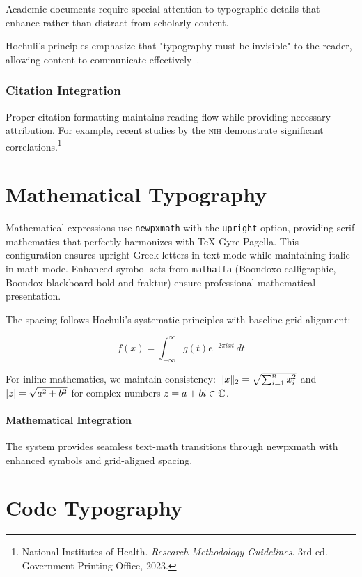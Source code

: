 \documentclass[11pt]{article}
\begin{document}
Academic documents require special attention to typographic details that enhance rather than distract from scholarly content.

Hochuli's principles emphasize that "typography must be invisible" to the reader, allowing content to communicate effectively~\parencite{hochuli1987detail}.

\subsubsection{Citation Integration}

Proper citation formatting maintains reading flow while providing necessary attribution. For example, recent studies by the \textsc{nih} demonstrate significant correlations.\footnote{National Institutes of Health. \textit{Research Methodology Guidelines}. 3rd ed. Government Printing Office, 2023.}

\section{Mathematical Typography}

Mathematical expressions use \texttt{newpxmath} with the \texttt{upright} option, providing serif mathematics that perfectly harmonizes with TeX Gyre Pagella. This configuration ensures upright Greek letters in text mode while maintaining italic in math mode. Enhanced symbol sets from \texttt{mathalfa} (Boondoxo calligraphic, Boondox blackboard bold and fraktur) ensure professional mathematical presentation.

The spacing follows Hochuli's systematic principles with baseline grid alignment:

\begin{equation}
f(x) = \int_{-\infty}^{\infty} g(t) e^{-2\pi i x t} \, dt
\end{equation}

For inline mathematics, we maintain consistency: $\lVert x\rVert_2 = \sqrt{\sum_{i=1}^n x_i^2}$ and $\lvert z\rvert = \sqrt{a^2 + b^2}$ for complex numbers $z = a + bi \in \mathbb{C}$.

\paragraph{Mathematical Integration} The system provides seamless text-math transitions through newpxmath with enhanced symbols and grid-aligned spacing.

\section{Code Typography}
\end{document}
